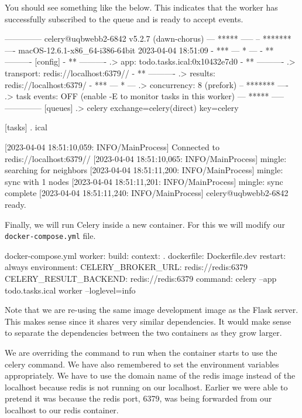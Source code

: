 \documentclass{csse4400}
\begin{document}
You should see something like the below.
This indicates that the worker has successfully subscribed to the queue and is ready to accept events.

\begin{code}[numbers=none]{}

 -------------- celery@uqbwebb2-6842 v5.2.7 (dawn-chorus)
--- ***** -----
-- ******* ---- macOS-12.6.1-x86_64-i386-64bit 2023-04-04 18:51:09
- *** --- * ---
- ** ---------- [config]
- ** ---------- .> app:         todo.tasks.ical:0x10432e7d0
- ** ---------- .> transport:   redis://localhost:6379//
- ** ---------- .> results:     redis://localhost:6379/
- *** --- * --- .> concurrency: 8 (prefork)
-- ******* ---- .> task events: OFF (enable -E to monitor tasks in this worker)
--- ***** -----
 -------------- [queues]
                .> celery           exchange=celery(direct) key=celery


[tasks]
  . ical

[2023-04-04 18:51:10,059: INFO/MainProcess] Connected to redis://localhost:6379//
[2023-04-04 18:51:10,065: INFO/MainProcess] mingle: searching for neighbors
[2023-04-04 18:51:11,200: INFO/MainProcess] mingle: sync with 1 nodes
[2023-04-04 18:51:11,201: INFO/MainProcess] mingle: sync complete
[2023-04-04 18:51:11,240: INFO/MainProcess] celery@uqbwebb2-6842 ready.
\end{code}

Finally, we will run Celery inside a new container.
For this we will modify our \texttt{docker-compose.yml} file.

\begin{code}[numbers=none]{docker-compose.yml}
worker:
  build:
    context: .
    dockerfile: Dockerfile.dev
  restart: always
  environment:
    CELERY_BROKER_URL: redis://redis:6379
    CELERY_RESULT_BACKEND: redis://redis:6379
  command: celery --app todo.tasks.ical worker --loglevel=info
\end{code}

Note that we are re-using the same image development image as the Flask server.
This makes sense since it shares very similar dependencies.
It would make sense to separate the dependencies between the two containers as they grow larger.

We are overriding the command to run when the container starts to use the celery command.
We have also remembered to set the environment variables appropriately.
We have to use the domain name of the redis image instead of the localhost because redis is not running on our localhost.
Earlier we were able to pretend it was because the redis port, 6379, was being forwarded from our localhost to our redis container.
\end{document}
